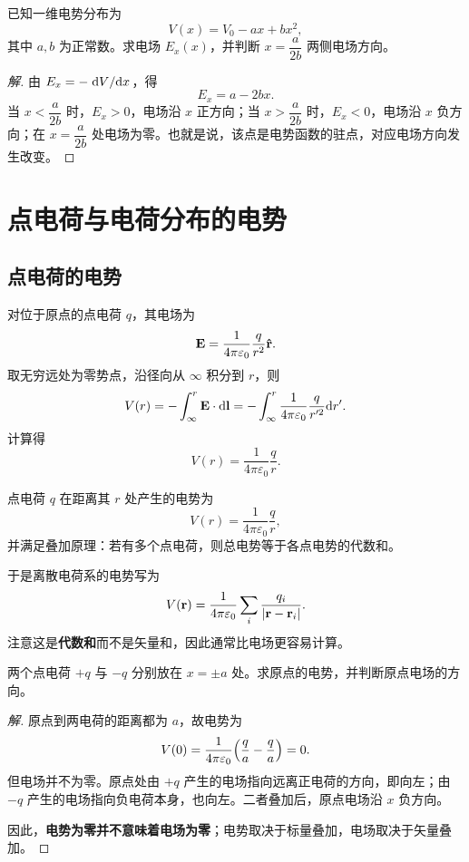 \begin{example}
已知一维电势分布为
\[
V(x)=V_0-ax+bx^2,
\]
其中 $a,b$ 为正常数。求电场 $E_x(x)$，并判断 $x=\dfrac{a}{2b}$ 两侧电场方向。
\end{example}

\begin{proof}[解]
由 $E_x=-\dv*{V}{x}$，得
\[
E_x=a-2bx.
\]
当 $x<\dfrac{a}{2b}$ 时，$E_x>0$，电场沿 $x$ 正方向；当 $x>\dfrac{a}{2b}$ 时，$E_x<0$，电场沿 $x$ 负方向；在 $x=\dfrac{a}{2b}$ 处电场为零。也就是说，该点是电势函数的驻点，对应电场方向发生改变。
\end{proof}

\section{点电荷与电荷分布的电势}

\subsection{点电荷的电势}

对位于原点的点电荷 $q$，其电场为
\[
\vb E=\frac{1}{4\pi\varepsilon_0}\frac{q}{r^2}\vu{r}.
\]
取无穷远处为零势点，沿径向从 $\infty$ 积分到 $r$，则
\[
V(r)=-\int_\infty^r \vb E\cdot \dd\vb l
=-\int_\infty^r \frac{1}{4\pi\varepsilon_0}\frac{q}{r'^2}\dd r'.
\]
计算得
\[
V(r)=\frac{1}{4\pi\varepsilon_0}\frac{q}{r}.
\]

\begin{law}
点电荷 $q$ 在距离其 $r$ 处产生的电势为
\[
V(r)=\frac{1}{4\pi\varepsilon_0}\frac{q}{r},
\]
并满足叠加原理：若有多个点电荷，则总电势等于各点电势的代数和。
\end{law}

于是离散电荷系的电势写为
\[
V(\vb r)=\frac{1}{4\pi\varepsilon_0}\sum_i \frac{q_i}{\abs{\vb r-\vb r_i}}.
\]
注意这是\textbf{代数和}而不是矢量和，因此通常比电场更容易计算。

\begin{example}
两个点电荷 $+q$ 与 $-q$ 分别放在 $x=\pm a$ 处。求原点的电势，并判断原点电场的方向。
\end{example}

\begin{proof}[解]
原点到两电荷的距离都为 $a$，故电势为
\[
V(0)=\frac{1}{4\pi\varepsilon_0}\qty(\frac{q}{a}-\frac{q}{a})=0.
\]
但电场并不为零。原点处由 $+q$ 产生的电场指向远离正电荷的方向，即向左；由 $-q$ 产生的电场指向负电荷本身，也向左。二者叠加后，原点电场沿 $x$ 负方向。

因此，\textbf{电势为零并不意味着电场为零}；电势取决于标量叠加，电场取决于矢量叠加。
\end{proof}

